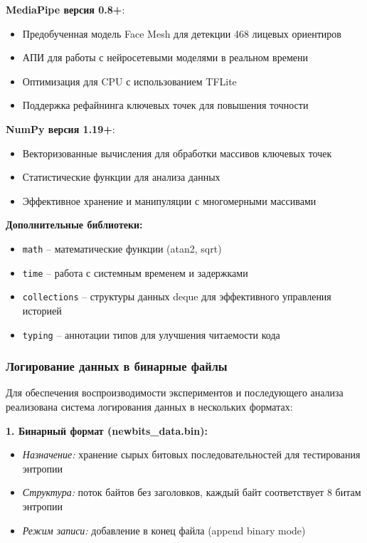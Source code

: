 \documentclass[14pt, a4paper]{extreport}
\begin{document}
\textbf{MediaPipe версия 0.8+}: 
\begin{itemize}
    \item Предобученная модель Face Mesh для детекции 468 лицевых ориентиров
    \item АПИ для работы с нейросетевыми моделями в реальном времени
    \item Оптимизация для CPU с использованием TFLite
    \item Поддержка рефайнинга ключевых точек для повышения точности
\end{itemize}

\textbf{NumPy версия 1.19+}: 
\begin{itemize}
    \item Векторизованные вычисления для обработки массивов ключевых точек
    \item Статистические функции для анализа данных
    \item Эффективное хранение и манипуляции с многомерными массивами
\end{itemize}

\textbf{Дополнительные библиотеки:}
\begin{itemize}
    \item \texttt{math} -- математические функции (atan2, sqrt)
    \item \texttt{time} -- работа с системным временем и задержками
    \item \texttt{collections} -- структуры данных deque для эффективного управления историей
    \item \texttt{typing} -- аннотации типов для улучшения читаемости кода
\end{itemize}

\subsubsection{Логирование данных в бинарные файлы}

Для обеспечения воспроизводимости экспериментов и последующего анализа реализована система логирования данных в нескольких форматах:

\textbf{1. Бинарный формат (newbits\_data.bin):}
\begin{itemize}
    \item \textit{Назначение:} хранение сырых битовых последовательностей для тестирования энтропии
    \item \textit{Структура:} поток байтов без заголовков, каждый байт соответствует 8 битам энтропии
    \item \textit{Режим записи:} добавление в конец файла (append binary mode)
\end{itemize}
\end{document}
